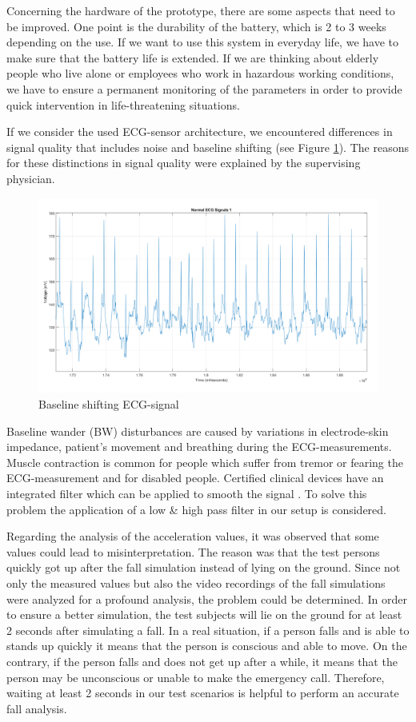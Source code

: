 \documentclass[review]{elsarticle}
\begin{document}
Concerning the hardware of the prototype, there are some aspects that need to be improved. One point is the durability of the battery, which is 2 to 3 weeks depending on the use. If we want to use this system in everyday life, we have to make sure that the battery life is extended. If we are thinking about elderly people who live alone or employees who work in hazardous working conditions, we have to ensure a permanent monitoring of the parameters in order to provide quick intervention in life-threatening situations.

If we consider the used ECG-sensor architecture, we encountered differences in signal quality that includes noise and baseline shifting (see Figure \ref{fig:ECGBaselineShifting}). The reasons for these distinctions in signal quality were explained by the supervising physician. 
\begin{figure}[!ht]
	\centering
	\includegraphics[scale=0.28]{Images/NormalECG1.png}
	\caption[Measured ECG-signal]{Baseline shifting ECG-signal}
	\label{fig:ECGBaselineShifting}
\end{figure}
Baseline wander (BW) disturbances are caused by variations in electrode-skin impedance, patient's movement and breathing during the ECG-measurements. Muscle contraction is common for people which suffer from tremor or fearing the ECG-measurement and for disabled people. Certified clinical devices have an integrated filter which can be applied to smooth the signal \cite{ECGNoise,DrNicoletteWagner}. To solve this problem the application of a low \& high pass filter in our setup is considered.

Regarding the analysis of the acceleration values, it was observed that some values could lead to misinterpretation. The reason was that the test persons quickly got up after the fall simulation instead of lying on the ground.
Since not only the measured values but also the video recordings of the fall simulations were analyzed for a profound analysis, the problem could be determined. In order to ensure a better simulation, the test subjects will lie on the ground for at least 2 seconds after simulating a fall. In a real situation, if a person falls and is able to stands up quickly it means that the person is conscious and able to move. On the contrary, if the person falls and does not get up after a while, it means that the person may be unconscious or unable to make the emergency call.  Therefore, waiting at least 2 seconds in our test scenarios is helpful to perform an accurate fall analysis.
\end{document}

